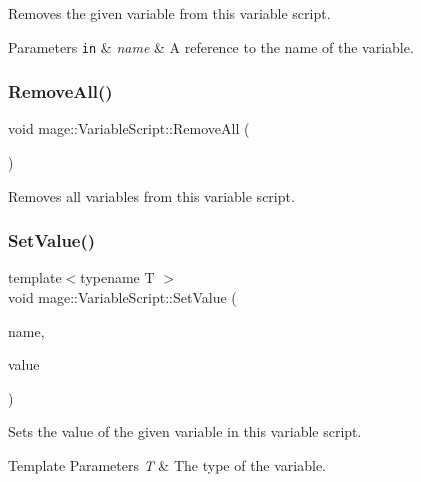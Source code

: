 Removes the given variable from this variable script.


\begin{DoxyParams}[1]{Parameters}
\mbox{\tt in}  & {\em name} & A reference to the name of the variable. \\
\hline
\end{DoxyParams}
\mbox{\label{classmage_1_1_variable_script_add51955d83e85e6d6acd82cfe40bed26}} 
\subsubsection{\texorpdfstring{Remove\+All()}{RemoveAll()}}
{\footnotesize\ttfamily void mage\+::\+Variable\+Script\+::\+Remove\+All (\begin{DoxyParamCaption}{ }\end{DoxyParamCaption})\hspace{0.3cm}{\ttfamily [noexcept]}}

Removes all variables from this variable script. \mbox{\label{classmage_1_1_variable_script_a43772c8d83466b32a6f16e5564d43026}} 
\subsubsection{\texorpdfstring{Set\+Value()}{SetValue()}}
{\footnotesize\ttfamily template$<$typename T $>$ \\
void mage\+::\+Variable\+Script\+::\+Set\+Value (\begin{DoxyParamCaption}\item[{const string \&}]{name,  }\item[{T}]{value }\end{DoxyParamCaption})}

Sets the value of the given variable in this variable script.


\begin{DoxyTemplParams}{Template Parameters}
{\em T} & The type of the variable. \\
\hline
\end{DoxyTemplParams}

